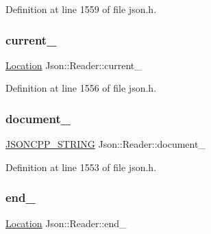 Definition at line 1559 of file json.\+h.

\hypertarget{class_json_1_1_reader_a2f2feb5201a26da7aa133d2f7434479b}{}\label{class_json_1_1_reader_a2f2feb5201a26da7aa133d2f7434479b} 
\subsubsection{\texorpdfstring{current\+\_\+}{current\_}}
{\footnotesize\ttfamily \hyperlink{class_json_1_1_reader_a46795b5b272bf79a7730e406cb96375a}{Location} Json\+::\+Reader\+::current\+\_\+\hspace{0.3cm}{\ttfamily [private]}}



Definition at line 1556 of file json.\+h.

\hypertarget{class_json_1_1_reader_abf99e137bc92a93623dc97598702261a}{}\label{class_json_1_1_reader_abf99e137bc92a93623dc97598702261a} 
\subsubsection{\texorpdfstring{document\+\_\+}{document\_}}
{\footnotesize\ttfamily \hyperlink{config_8h_a1e723f95759de062585bc4a8fd3fa4be}{J\+S\+O\+N\+C\+P\+P\+\_\+\+S\+T\+R\+I\+NG} Json\+::\+Reader\+::document\+\_\+\hspace{0.3cm}{\ttfamily [private]}}



Definition at line 1553 of file json.\+h.

\hypertarget{class_json_1_1_reader_a714793579cbf4ee7c5a7223d2c8d77c1}{}\label{class_json_1_1_reader_a714793579cbf4ee7c5a7223d2c8d77c1} 
\subsubsection{\texorpdfstring{end\+\_\+}{end\_}}
{\footnotesize\ttfamily \hyperlink{class_json_1_1_reader_a46795b5b272bf79a7730e406cb96375a}{Location} Json\+::\+Reader\+::end\+\_\+\hspace{0.3cm}{\ttfamily [private]}}



